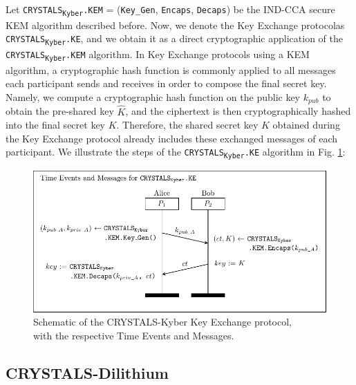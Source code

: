 \documentclass[runningheads]{llncs}
\numberwithin{equation}{section}
\begin{document}
    Let \texorpdfstring{\texttt{CRYSTALS}\textsubscript{\texttt{Kyber}}\texttt{.KEM} = \big(\texttt{Key\_Gen}, \texttt{Encaps}, \texttt{Decaps}\big)}\/ be the IND-CCA secure KEM algorithm described before. Now, we denote the Key Exchange protocol\break as \texorpdfstring{\texttt{CRYSTALS}\textsubscript{\texttt{Kyber}}\texttt{.KE}}\/, and we obtain it as a direct cryptographic application of the \texorpdfstring{\texttt{CRYSTALS}\textsubscript{\texttt{Kyber}}\texttt{.KEM}}\/ algorithm. In Key Exchange protocols using a KEM algorithm, a cryptographic hash function is commonly applied to all messages each participant sends and receives in order to compose the final secret key. Namely, we compute a cryptographic hash function on the public key ${k}_{pub}$ to obtain the pre-shared key $\hat{K}$, and the ciphertext is then cryptographically hashed into the final secret key $K$. Therefore, the shared secret key $K$ obtained during the Key Exchange protocol already includes these exchanged messages of each participant. We illustrate the steps of the \texorpdfstring{\texttt{CRYSTALS}\textsubscript{\texttt{Kyber}}\texttt{.KE}}\/ algorithm in Fig. \ref{fig:crystals-kyber-key-exchange-protocol-schematic}:

    \vspace{-3ex}
    \begin{figure}[!ht]
        \centering
        \captionsetup{justification=centering}
        \includegraphics[width=\textwidth]{figures/sections/section-3/crystals-kyber-key-exchange-protocol-schematic.pdf}
        \caption{Schematic of the CRYSTALS-Kyber Key Exchange protocol,\\ with the respective Time Events and Messages.}
        \label{fig:crystals-kyber-key-exchange-protocol-schematic}
    \end{figure}

    
    \subsection{CRYSTALS-Dilithium}
    \label{subsec:crystals-dilithium}
\end{document}
